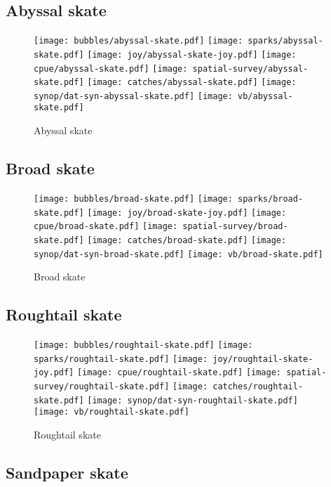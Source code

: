 \subsection*{Abyssal skate}

\begin{figure}[htbp]
\centering
\texttt{[image: bubbles/abyssal-skate.pdf]}
\texttt{[image: sparks/abyssal-skate.pdf]}
\texttt{[image: joy/abyssal-skate-joy.pdf]}
\texttt{[image: cpue/abyssal-skate.pdf]}
\texttt{[image: spatial-survey/abyssal-skate.pdf]}
\texttt{[image: catches/abyssal-skate.pdf]}
\texttt{[image: synop/dat-syn-abyssal-skate.pdf]}
\texttt{[image: vb/abyssal-skate.pdf]}
\caption{Abyssal skate}
\end{figure}
\clearpage
\subsection*{Broad skate}

\begin{figure}[htbp]
\centering
\texttt{[image: bubbles/broad-skate.pdf]}
\texttt{[image: sparks/broad-skate.pdf]}
\texttt{[image: joy/broad-skate-joy.pdf]}
\texttt{[image: cpue/broad-skate.pdf]}
\texttt{[image: spatial-survey/broad-skate.pdf]}
\texttt{[image: catches/broad-skate.pdf]}
\texttt{[image: synop/dat-syn-broad-skate.pdf]}
\texttt{[image: vb/broad-skate.pdf]}
\caption{Broad skate}
\end{figure}
\clearpage
\subsection*{Roughtail skate}

\begin{figure}[htbp]
\centering
\texttt{[image: bubbles/roughtail-skate.pdf]}
\texttt{[image: sparks/roughtail-skate.pdf]}
\texttt{[image: joy/roughtail-skate-joy.pdf]}
\texttt{[image: cpue/roughtail-skate.pdf]}
\texttt{[image: spatial-survey/roughtail-skate.pdf]}
\texttt{[image: catches/roughtail-skate.pdf]}
\texttt{[image: synop/dat-syn-roughtail-skate.pdf]}
\texttt{[image: vb/roughtail-skate.pdf]}
\caption{Roughtail skate}
\end{figure}
\clearpage
\subsection*{Sandpaper skate}

